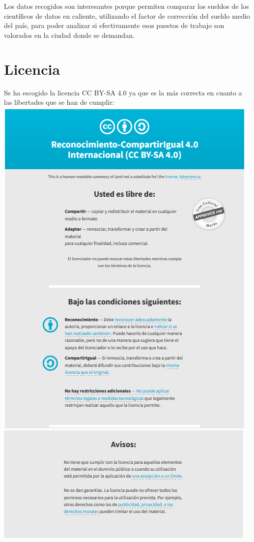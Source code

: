 \documentclass[IB]{PlantillaPACnova_Est}
\begin{document}
Los datos recogidos son interesantes porque permiten comparar los sueldos de los científicos de datos en caliente, utilizando el factor de corrección del sueldo medio del país, para poder analizar si efectivamente esos puestos de trabajo son valorados en la ciudad donde se demandan. 

\newpage 
\section{Licencia}
Se ha escogido la licencia CC BY-SA 4.0 ya que es la más correcta en cuanto a las libertades que se han de cumplir:
\\
\includegraphics [scale=0.75]{licencia1.png}
\\
\includegraphics [scale=0.75]{licencia2.png}
\end{document}
